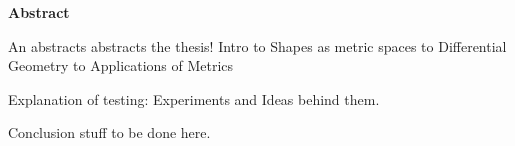 

\clearemptydoublepage
{}
{}	





\vspace*{2cm}
\begin{center}
{\Large \bfseries Abstract}
\end{center}
\vspace{1cm}

An abstracts abstracts the thesis!
Intro to Shapes as metric spaces to Differential Geometry to Applications of Metrics

Explanation of testing: Experiments and Ideas behind them.

Conclusion stuff to be done here.

